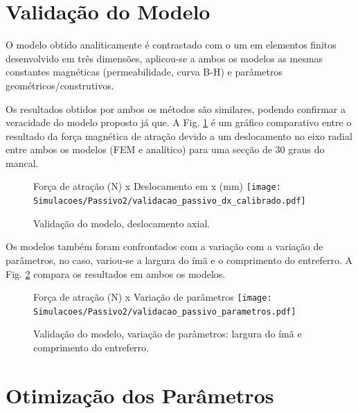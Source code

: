 %

\section{Validação do Modelo}

O modelo obtido analiticamente é contrastado com o um em elementos finitos desenvolvido em três dimensões, aplicou-se a ambos os modelos as mesmas constantes magnéticas (permeabilidade, curva B-H) e parâmetros geométricos/construtivos.

Os resultados obtidos por ambos os métodos são similares, podendo confirmar a veracidade do modelo proposto já que. A Fig. \ref{fig:validacao_passivo_dx_calibrado} é um gráfico comparativo entre o resultado da força magnética de atração devido a um deslocamento no eixo radial entre ambos os modelos (FEM e analítico) para uma secção de 30 graus do mancal.

\begin{figure}[th!]
	\centering
	Força de atração (N) x Deslocamento em x (mm)
	\texttt{[image: Simulacoes/Passivo2/validacao\_passivo\_dx\_calibrado.pdf]}
	\caption{Validação do modelo, deslocamento axial.}
	\label{fig:validacao_passivo_dx_calibrado}
\end{figure}

Os modelos também foram confrontados com a variação com a variação de parâmetros, no caso, variou-se a largura do ímã e o comprimento do entreferro. A Fig. \ref{fig:validacao_passivo_parametros} compara os resultados em ambos os modelos.

\begin{figure}[th!]
	\centering
	Força de atração (N) x Variação de parâmetros
	\texttt{[image: Simulacoes/Passivo2/validacao\_passivo\_parametros.pdf]}
	\caption{Validação do modelo, variação de parâmetros: largura do ímã e comprimento do entreferro.}
	\label{fig:validacao_passivo_parametros}
\end{figure} 

\section{Otimização dos Parâmetros}

